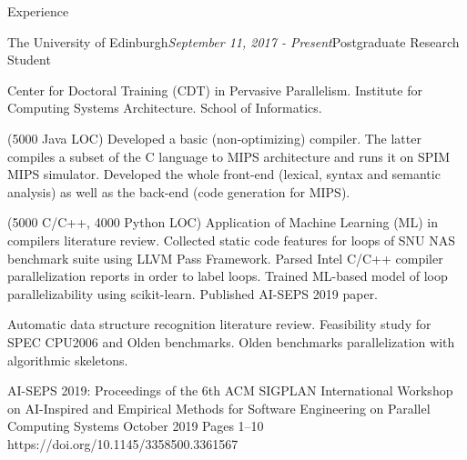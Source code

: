 \documentclass{resume} %
\begin{document}
\begin{rSection}{Experience}

\begin{rSubsection}{{\large The University of Edinburgh}}{\textit{September 11, 2017 - Present}}{Postgraduate Research Student}{}
\begin{description}[font=$\bullet$~\normalfont\scshape\color{red!50!black}, width=0.95\textwidth]
\item [Group] Center for Doctoral Training (CDT) in Pervasive Parallelism. Institute for Computing Systems Architecture. School of Informatics.
\item [Compiling Techniques Coursework.] {\footnotesize (5000 Java LOC)} Developed a basic (non-optimizing) compiler. The latter compiles a subset of the C language to MIPS architecture and runs it on SPIM MIPS simulator. Developed the whole front-end (lexical, syntax and semantic analysis) as well as the back-end (code generation for MIPS).
\item [ML-based Parallelization Assistant] {\footnotesize (5000 C/C++, 4000 Python LOC)} Application of Machine Learning (ML) in compilers literature review. Collected static code features for loops of SNU NAS benchmark suite using LLVM Pass Framework. Parsed Intel C/C++ compiler parallelization reports in order to label loops. Trained ML-based model of loop parallelizability using scikit-learn. Published AI-SEPS 2019 paper.
\item [Data-Centric Parallelization] Automatic data structure recognition literature review. Feasibility study for SPEC CPU2006 and Olden benchmarks. Olden benchmarks parallelization with algorithmic skeletons.
\item [Publication.] AI-SEPS 2019: Proceedings of the 6th ACM SIGPLAN International Workshop on AI-Inspired and Empirical Methods for Software Engineering on Parallel Computing Systems October 2019 Pages 1–10 https://doi.org/10.1145/3358500.3361567
\end{description}


\end{rSubsection}
\end{rSection}
\end{document}
